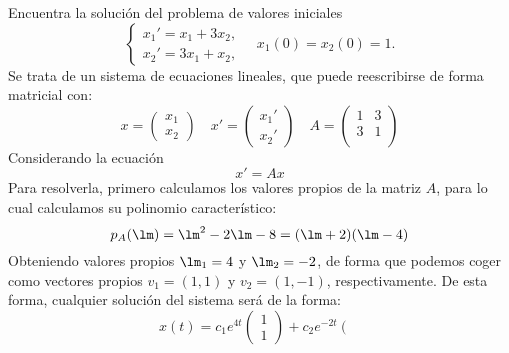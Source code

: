 \documentclass[12pt]{article}
\begin{document}
    \begin{ejercicio}
        Encuentra la solución del problema de valores iniciales
        \begin{equation*}
            \begin{cases}
                x_1'=x_1+3x_2,\\
                x_2'=3x_1+x_2,
            \end{cases}
            \quad x_1(0)=x_2(0)=1.
        \end{equation*}
        Se trata de un sistema de ecuaciones lineales, que puede reescribirse de forma matricial con:
        \begin{equation*}
            x = \left(\begin{array}{c}
                x_1 \\
                x_2 
            \end{array}\right) \quad 
            x' = \left(\begin{array}{c}
                x_1' \\
                x_2' 
            \end{array}\right) \quad 
            A = \left(\begin{array}{cc}
                    1 & 3 \\
                    3 & 1 \\
            \end{array}\right)
        \end{equation*}
        Considerando la ecuación
        \begin{equation*}
            x' = Ax
        \end{equation*}
        Para resolverla, primero calculamos los valores propios de la matriz $A$, para lo cual calculamos su polinomio característico:
        \begin{equation*}
            p_A(\lm) = \lm^2 - 2\lm -8 = (\lm +2)(\lm-4)
        \end{equation*}
        Obteniendo valores propios $\lm_1=4$ y $\lm_2=-2$, de forma que podemos coger como vectores propios $v_1=(1,1)$ y $v_2=(1,-1)$, respectivamente. De esta forma, cualquier solución del sistema será de la forma:
        \begin{equation*}
            x(t) = c_1 e^{4t} \left(\begin{array}{c}
                1 \\
                1 
            \end{array}\right) + c_2 e^{-2t} \left(\begin{array}{c}

\end{array}
\end{equation*}
\end{ejercicio}
\end{document}
